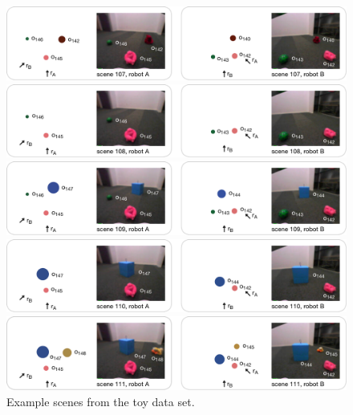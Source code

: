 \begin{figure}[p]
  \parbox{\textwidth}{%
    \includegraphics[width=\textwidth]
    {figures/data-sets-toys-scene-1}\vspace{4.5mm}%

    \includegraphics[width=\textwidth]
    {figures/data-sets-toys-scene-2}\vspace{4.5mm}%

    \includegraphics[width=\textwidth]
    {figures/data-sets-toys-scene-3}\vspace{4.5mm}%

    \includegraphics[width=\textwidth]
    {figures/data-sets-toys-scene-4}\vspace{4.5mm}%

    \includegraphics[width=\textwidth]
    {figures/data-sets-toys-scene-5}\vspace{10mm}}
  \caption{Example scenes from the toy data set.}
  \label{f:example-scenes-toy-set}
\end{figure}


